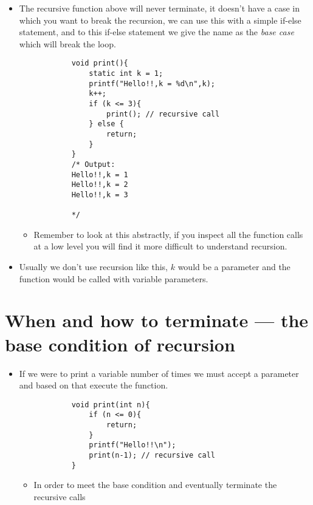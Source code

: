 \begin{itemize}
    \item The recursive function above will never terminate, it doesn't have a case in which you want to break the recursion, we can use this with a simple if-else statement, and to this if-else statement we give the name as the \emph{base case} which will break the loop.
        \begin{verbatim}
            void print(){
                static int k = 1;
                printf("Hello!!,k = %d\n",k);
                k++;
                if (k <= 3){
                    print(); // recursive call
                } else {
                    return;
                }
            }
            /* Output:
            Hello!!,k = 1
            Hello!!,k = 2
            Hello!!,k = 3

            */
        \end{verbatim}
        \begin{itemize}
            \item Remember to look at this abstractly, if you inspect all the function calls at a low level you will find it more difficult to understand recursion.
        \end{itemize}
    
    \item Usually we don't use recursion like this, $k$ would be a parameter and the function would be called with variable parameters. 
\end{itemize}


\section{When and how to terminate — the base condition of recursion}
\begin{itemize}
    \item If we were to print a variable number of times we must accept a parameter and based on that execute the function. 
        \begin{verbatim}
            void print(int n){
                if (n <= 0){
                    return; 
                }
                printf("Hello!!\n");
                print(n-1); // recursive call
            }
        \end{verbatim}
        \begin{itemize}
            \item In order to meet the base condition and eventually terminate the recursive calls  
        \end{itemize}
\end{itemize}


